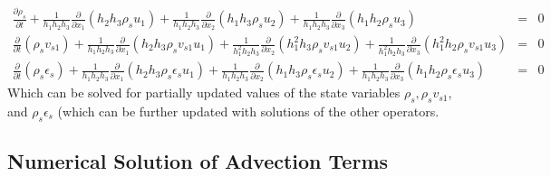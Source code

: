 \documentclass[11pt,letterpaper]{article}
\begin{document}
\begin{eqnarray}
\frac{\partial \rho_s}{\partial t} + \frac{1}{h_1 h_2 h_3} \frac{\partial}{\partial x_1} \left( h_2 h_3 \rho_s u_1 \right) + \frac{1}{h_1 h_2 h_3} \frac{\partial}{\partial x_2} \left( h_1 h_3 \rho_s u_2 \right) + \frac{1}{h_1 h_2 h_3} \frac{\partial}{\partial x_3} \left( h_1 h_2 \rho_s u_3 \right) &=& 0 \nonumber \\
\frac{\partial}{\partial t} \left( \rho_s v_{s1} \right) + \frac{1}{h_1 h_2 h_3} \frac{\partial}{\partial x_1} \left( h_2 h_3 \rho_s v_{s1} u_1 \right) + \frac{1}{h_1^2 h_2 h_3} \frac{\partial}{\partial x_2} \left( h_1^2 h_3 \rho_s v_{s1} u_2 \right) + \frac{1}{h_1^2 h_2 h_3} \frac{\partial}{\partial x_3} \left( h_1^2 h_2 \rho_s v_{s1} u_3 \right) &=& 0 \nonumber \\
\frac{\partial}{\partial t} \left( \rho_s \epsilon_s \right) + \frac{1}{h_1 h_2 h_3} \frac{\partial}{\partial x_1} \left( h_2 h_3 \rho_s \epsilon_s u_1 \right) + \frac{1}{h_1 h_2 h_3} \frac{\partial}{\partial x_2} \left( h_1 h_3 \rho_s \epsilon_s u_2 \right) + \frac{1}{h_1 h_2 h_3} \frac{\partial}{\partial x_3} \left( h_1 h_2 \rho_s \epsilon_s u_3 \right) &=& 0 \nonumber 
\end{eqnarray}
Which can be solved for partially updated values of the state variables $\rho_s,\rho_s v_{s1}$, and $\rho_s \epsilon_s$ (which can be further updated with solutions of the other operators.  


\subsection{Numerical Solution of Advection Terms}  \label{sec:numadv}
\end{document}
